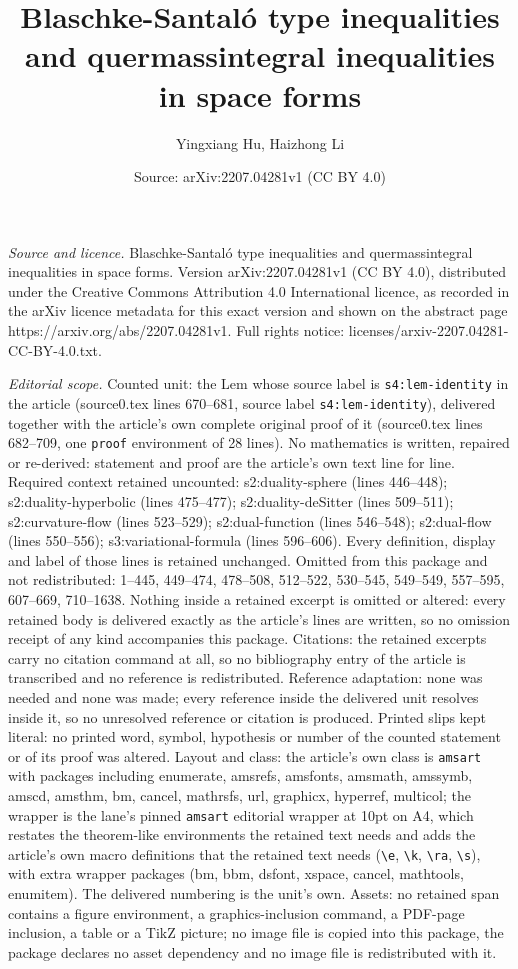 \documentclass[10pt,a4paper]{amsart}
\title[Blaschke-Santal\'o type inequalities and quermassintegral in]{Blaschke-Santal\'o type inequalities and quermassintegral inequalities in space forms}
\author{Yingxiang Hu, Haizhong Li}
\date{Source: arXiv:2207.04281v1 (CC BY 4.0)}
\begin{document}
\maketitle

\noindent\emph{Source and licence.} Blaschke-Santal\'o type inequalities and quermassintegral inequalities in space forms. Version arXiv:2207.04281v1 (CC BY 4.0), distributed under the Creative Commons Attribution 4.0 International licence, as recorded in the arXiv licence metadata for this exact version and shown on the abstract page https://arxiv.org/abs/2207.04281v1. Full rights notice: licenses/arxiv-2207.04281-CC-BY-4.0.txt.\par\smallskip

\noindent\textit{Editorial scope.} Counted unit: the Lem whose source label is \texttt{s4:lem-identity} in the article (source0.tex lines 670--681, source label \texttt{s4:lem-identity}), delivered together with the article's own complete original proof of it (source0.tex lines 682--709, one \texttt{proof} environment of 28 lines). No mathematics is written, repaired or re-derived: statement and proof are the article's own text line for line. Required context retained uncounted: s2:duality-sphere (lines 446--448); s2:duality-hyperbolic (lines 475--477); s2:duality-deSitter (lines 509--511); s2:curvature-flow (lines 523--529); s2:dual-function (lines 546--548); s2:dual-flow (lines 550--556); s3:variational-formula (lines 596--606). Every definition, display and label of those lines is retained unchanged. Omitted from this package and not redistributed: 1--445, 449--474, 478--508, 512--522, 530--545, 549--549, 557--595, 607--669, 710--1638. Nothing inside a retained excerpt is omitted or altered: every retained body is delivered exactly as the article's lines are written, so no omission receipt of any kind accompanies this package. Citations: the retained excerpts carry no citation command at all, so no bibliography entry of the article is transcribed and no reference is redistributed. Reference adaptation: none was needed and none was made; every reference inside the delivered unit resolves inside it, so no unresolved reference or citation is produced. Printed slips kept literal: no printed word, symbol, hypothesis or number of the counted statement or of its proof was altered. Layout and class: the article's own class is \texttt{amsart} with packages including enumerate, amsrefs, amsfonts, amsmath, amssymb, amscd, amsthm, bm, cancel, mathrsfs, url, graphicx, hyperref, multicol; the wrapper is the lane's pinned \texttt{amsart} editorial wrapper at 10pt on A4, which restates the theorem-like environments the retained text needs and adds the article's own macro definitions that the retained text needs (\texttt{\textbackslash e}, \texttt{\textbackslash k}, \texttt{\textbackslash ra}, \texttt{\textbackslash s}), with extra wrapper packages (bm, bbm, dsfont, xspace, cancel, mathtools, enumitem). The delivered numbering is the unit's own. Assets: no retained span contains a figure environment, a graphics-inclusion command, a PDF-page inclusion, a table or a TikZ picture; no image file is copied into this package, the package declares no asset dependency and no image file is redistributed with it. 
\end{document}
